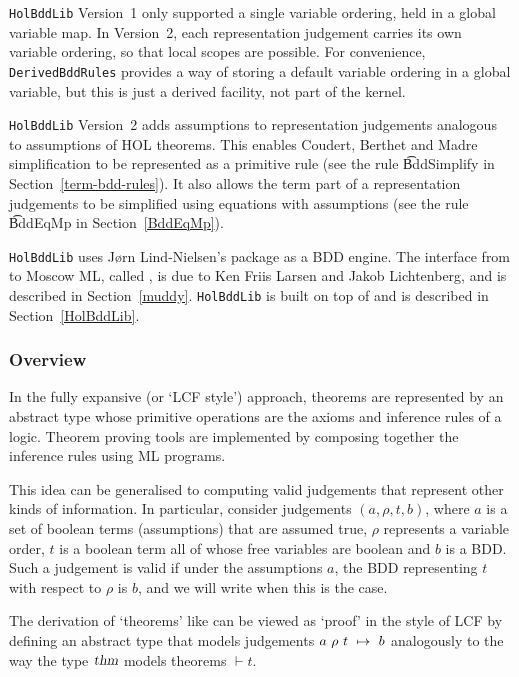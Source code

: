 {\tt{HolBddLib}} Version~1 only supported a single variable
ordering, held in a global variable map. In Version~2, each
representation judgement carries its own variable ordering, so that local
scopes are possible. For convenience, {\tt{DerivedBddRules}}
provides a way of storing a default variable ordering in a global
variable, but this is just a derived facility, not part of the kernel.

{\tt{HolBddLib}} Version~2 adds assumptions to representation judgements
analogous to assumptions of HOL theorems. This enables
Coudert, Berthet and Madre simplification to be represented as a primitive
rule (see the rule \t{BddSimplify} in Section~\ref{term-bdd-rules}). It also allows the term part
of a representation judgements to be simplified using equations with assumptions
(see the rule \t{BddEqMp} in Section~\ref{BddEqMp}).

{\tt HolBddLib} uses J{\o}rn Lind-Nielsen's \Buddy{} package as a BDD
engine. The interface from \Buddy{} to Moscow ML, called \Muddy, is
due to Ken Friis Larsen and Jakob Lichtenberg, and is described in Section~\ref{muddy}.
{\tt HolBddLib} is built on top of \Muddy{} and
is described in Section~\ref{HolBddLib}.

\subsubsection{Overview}

In the fully expansive (or `LCF style') approach, theorems are represented by an abstract type
whose primitive operations are the axioms and inference rules of a
logic.  Theorem proving tools are implemented by composing together
the inference rules using ML programs.

This idea can be generalised to computing valid judgements that
represent other kinds of information. In particular, consider
judgements $(a,\rho,t,b)$, where $a$ is a set of boolean terms
(assumptions) that are assumed true, $\rho$ represents a variable
order, $t$ is a boolean term all of whose free variables are boolean
and $b$ is a BDD. Such a judgement is valid if under the assumptions
$a$, the BDD representing $t$ with respect to $\rho$ is $b$, and we
will write  when this is the case.

The derivation of `theorems' like  can be viewed
as `proof' in the style of LCF by defining an abstract type \termbddty{}
that models
judgements $\mbox{$a~\rho~t~\mapsto~b$}$ analogously
to the way the type $\textsl{thm}$ models theorems $\vdash t$.

